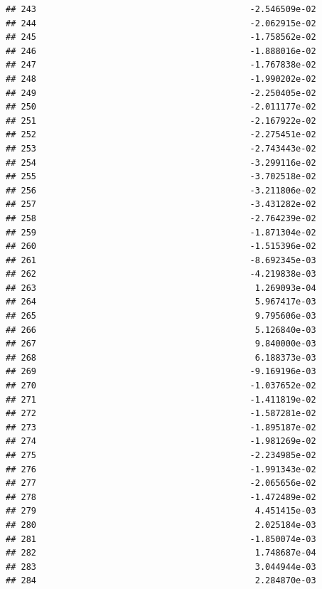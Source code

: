 \documentclass[
]{article}
\begin{document}
\begin{verbatim}
## 243                                          -2.546509e-02
## 244                                          -2.062915e-02
## 245                                          -1.758562e-02
## 246                                          -1.888016e-02
## 247                                          -1.767838e-02
## 248                                          -1.990202e-02
## 249                                          -2.250405e-02
## 250                                          -2.011177e-02
## 251                                          -2.167922e-02
## 252                                          -2.275451e-02
## 253                                          -2.743443e-02
## 254                                          -3.299116e-02
## 255                                          -3.702518e-02
## 256                                          -3.211806e-02
## 257                                          -3.431282e-02
## 258                                          -2.764239e-02
## 259                                          -1.871304e-02
## 260                                          -1.515396e-02
## 261                                          -8.692345e-03
## 262                                          -4.219838e-03
## 263                                           1.269093e-04
## 264                                           5.967417e-03
## 265                                           9.795606e-03
## 266                                           5.126840e-03
## 267                                           9.840000e-03
## 268                                           6.188373e-03
## 269                                          -9.169196e-03
## 270                                          -1.037652e-02
## 271                                          -1.411819e-02
## 272                                          -1.587281e-02
## 273                                          -1.895187e-02
## 274                                          -1.981269e-02
## 275                                          -2.234985e-02
## 276                                          -1.991343e-02
## 277                                          -2.065656e-02
## 278                                          -1.472489e-02
## 279                                           4.451415e-03
## 280                                           2.025184e-03
## 281                                          -1.850074e-03
## 282                                           1.748687e-04
## 283                                           3.044944e-03
## 284                                           2.284870e-03

\end{verbatim}
\end{document}
